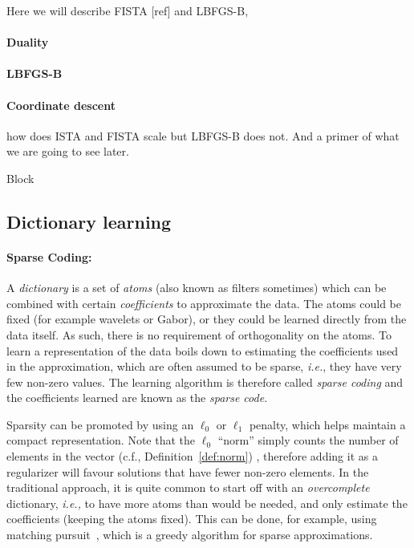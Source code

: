 Here we will describe FISTA [ref] and LBFGS-B, 

\paragraph{Duality}

\paragraph{LBFGS-B}

\paragraph{Coordinate descent}

how does ISTA and FISTA scale but LBFGS-B does not. And a primer of what we are going to see later.

Block


\subsection{Dictionary learning}
\label{sec:background_dict_learning}

\paragraph{Sparse Coding:} A \emph{dictionary} is a set of \emph{atoms} (also known as filters sometimes) which can be combined with certain \emph{coefficients} to approximate the data. The atoms could be fixed (for example wavelets or Gabor), or they could be learned directly from the data itself. As such, there is no requirement of orthogonality on the atoms. To learn a representation of the data boils down to estimating the coefficients used in the approximation, which are often assumed to be sparse, \emph{i.e.}, they have very few non-zero values. The learning algorithm is therefore called \emph{sparse coding} and the coefficients learned are known as the \emph{sparse code}.

Sparsity can be promoted by using an $\ell_0$ or $\ell_1$ penalty, which helps maintain a compact representation. Note that the $\ell_0$ ``norm'' simply counts the number of elements in the vector (c.f., Definition~\ref{def:norm}) , therefore adding it as a regularizer will favour solutions that have fewer non-zero elements. In the traditional approach, it is quite common to start off with an \emph{overcomplete} dictionary, \emph{i.e.,} to have more atoms than would be needed, and only estimate the coefficients (keeping the atoms fixed). This can be done, for example, using matching pursuit~\citep{mallat1993matching}, which is a greedy algorithm for sparse approximations.

